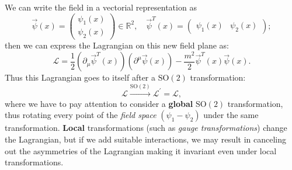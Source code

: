 We can write the field in a vectorial representation as
\[
    \vec{\psi}(x) = \begin{pmatrix}
        \psi_1 (x) \\
        \psi_2(x)
    \end{pmatrix} \in \mathbb{R}^2, \quad \vec{\psi}^T(x) = \begin{pmatrix}
        \psi_1 (x) & \psi_2(x)
    \end{pmatrix};
\]
then we can express the Lagrangian on this new field plane as:
\begin{equation}
    \mathcal{L} = \frac{1}{2} (\partial_\mu \vec{\psi}^T(x)) (\partial^{\mu} \vec{\psi}(x)) - \frac{m^2}{2}\vec{\psi}^T(x)\vec{\psi}(x).
    \label{eq:KG_lagrangian_two_fields_vector}
\end{equation}
Thus this Lagrangian goes to itself after a \(\mathrm{SO}(2)\) transformation:
\[
    \mathcal{L} \xrightarrow{\mathrm{SO}(2)} \mathcal{L}^{\prime} = \mathcal{L},
\]
where we have to pay attention to consider a \textbf{global} \(\mathrm{SO}(2)\) transformation, thus rotating every point of the \textit{field space} \((\psi_1 - \psi_2)\) under the same transformation. \textbf{Local} transformations (such as \textit{gauge transformations}) change the Lagrangian, but if we add suitable interactions, we may result in canceling out the asymmetries of the Lagrangian making it invariant even under local transformations.

